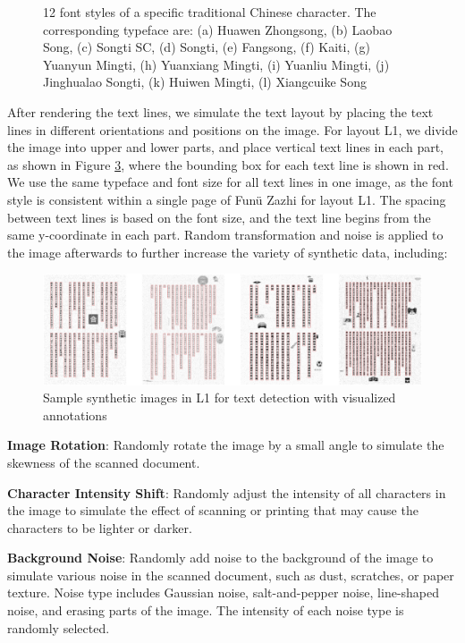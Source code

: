 \documentclass[12pt,twoside]{report}
\begin{document}
\begin{figure}[htbp]
\begin{subfigure}[b]{0.1\linewidth}
        \caption{}
        \label{fig:fonts12}
    \end{subfigure}
    \caption{12 font styles of a specific traditional Chinese character. The corresponding typeface are: (a) Huawen Zhongsong, (b) Laobao Song, (c) Songti SC, (d) Songti, (e) Fangsong, (f) Kaiti, (g) Yuanyun Mingti, (h) Yuanxiang Mingti, (i) Yuanliu Mingti, (j) Jinghualao Songti, (k) Huiwen Mingti, (l) Xiangcuike Song}
    \label{fig:fonts}
\end{figure}

After rendering the text lines, we simulate the text layout by placing the text lines in different orientations and positions on the image. For layout L1, we divide the image into upper and lower parts, and place vertical text lines in each part, as shown in Figure \ref{fig:synthetic_det1}, where the bounding box for each text line is shown in red. We use the same typeface and font size for all text lines in one image, as the font style is consistent within a single page of Funü Zazhi for layout L1. The spacing between text lines is based on the font size, and the text line begins from the same y-coordinate in each part. Random transformation and noise is applied to the image afterwards to further increase the variety of synthetic data, including:

\begin{figure}[htbp]
    \centering
    \includegraphics[width=\textwidth]{./figures/synthetic_det1.jpeg}
    \caption{Sample synthetic images in L1 for text detection with visualized annotations}
    \label{fig:synthetic_det1}
\end{figure}

\textbf{Image Rotation}: Randomly rotate the image by a small angle to simulate the skewness of the scanned document.

\textbf{Character Intensity Shift}: Randomly adjust the intensity of all characters in the image to simulate the effect of scanning or printing that may cause the characters to be lighter or darker.

\textbf{Background Noise}: Randomly add noise to the background of the image to simulate various noise in the scanned document, such as dust, scratches, or paper texture. Noise type includes Gaussian noise, salt-and-pepper noise, line-shaped noise, and erasing parts of the image. The intensity of each noise type is randomly selected.
\end{document}
